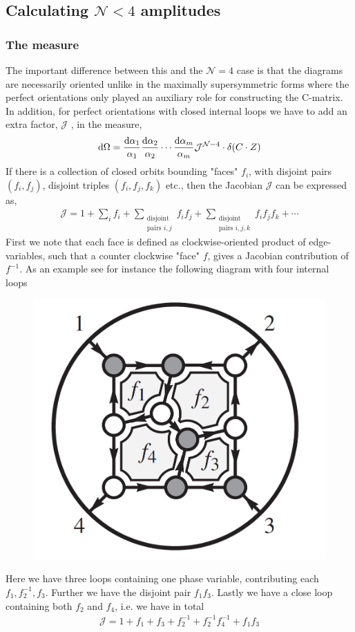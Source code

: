 \documentclass[letter,11pt]{article}
\begin{document}
\subsection{Calculating $\mathcal{N}<4$ amplitudes}
\subsubsection{The measure}
The important difference between this and the $\mathcal{N}=4$ case is that the diagrams are necessarily oriented unlike in the maximally supersymmetric forms where the perfect orientations only played an auxiliary role for constructing the C-matrix. In addition, for perfect orientations with closed internal loops we have to add an extra factor, $\mathcal{J}$ , in
the measure,
\begin{equation}
	\begin{aligned}
		\dd \Omega= \frac{\dd \alpha_1}{\alpha_1} \frac{\dd \alpha_2}{\alpha_2}\cdots  \frac{\dd \alpha_m}{\alpha_m} \mathcal{J}^{\mathcal{N}-4}\cdot \delta(C\cdot Z)
	\end{aligned}
\end{equation}
If there is a collection of closed orbits bounding "faces" $f_i$, with disjoint pairs $(f_i, f_j)$, disjoint triples $(f_i, f_j ,f_k)$ etc., then the Jacobian $\mathcal{J}$ can be expressed as,
\begin{equation}
	\begin{aligned}
		\mathcal{J}=1+\sum_if_i+\sum_{\substack{\text{disjoint}\\ \text{pairs } i,j}}f_i f_j+\sum_{\substack{\text{disjoint}\\ \text{pairs } i,j,k}}f_i f_j f_k+\cdots
	\end{aligned}
\end{equation}
First we note that each face is defined as clockwise-oriented product of edge-variables, such that a counter clockwise "face" $f$, gives a Jacobian contribution of $f^{-1}$. As an example see for instance the following diagram with four internal loops

\begin{figure}[H]
	\centering
	\includegraphics[width=0.3\linewidth]{Jexample}
	\caption{}
	\label{fig:jexample}
\end{figure}
Here we have three loops containing one phase variable, contributing each $f_1,f_2^{-1},f_{3}$. Further we have the disjoint pair $f_1f_3$. Lastly we have a close loop containing both $f_2$ and $f_4$, i.e. we have in total
\begin{equation}
	\begin{aligned}
		\mathcal{J}=1+f_1+f_3+f_2^{-1}+f_2^{-1}f_4^{-1}+f_1f_3
	\end{aligned}
\end{equation}
\end{document}

